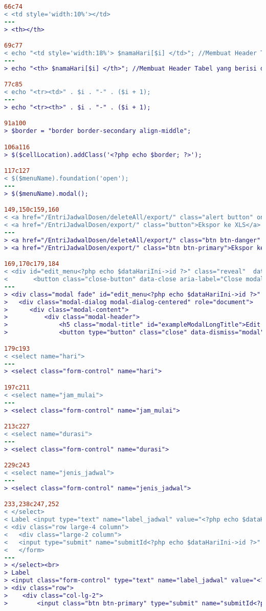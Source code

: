 \begin{lstlisting}[language=diff, caption=Kode untuk Halaman Entri Jadwal Dosen,  basicstyle=\ttfamily, frame=single,
columns=fullflexible, keepspaces=true, breaklines=true, label={lst:mainEntriJadwalDosen}]
66c74
< <td style='width:10%'></td>
---
> <th></th>

69c77
< echo "<td style='width:18%'> $namaHari[$i] </td>"; //Membuat Header Tabel yang berisi daftar hari
---
> echo "<th> $namaHari[$i] </th>"; //Membuat Header Tabel yang berisi daftar hari

77c85
< echo "<tr><td>" . $i . "-" . ($i + 1);
---
> echo "<tr><th>" . $i . "-" . ($i + 1);

91a100
> $border = "border border-secondary align-middle";

106a116
> $($cellLocation).addClass('<?php echo $border; ?>');

117c127
< $($menuName).foundation('open');
---
> $($menuName).modal();

149,150c159,160
< <a href="/EntriJadwalDosen/deleteAll/export/" class="alert button" onClick="return konfirmasi();">Delete All</a>
< <a href="/EntriJadwalDosen/export/" class="button">Ekspor ke XLS</a>
---
> <a href="/EntriJadwalDosen/deleteAll/export/" class="btn btn-danger" onClick="return konfirmasi();">Delete All</a>
> <a href="/EntriJadwalDosen/export/" class="btn btn-primary">Ekspor ke XLS</a>

169,170c179,184
< <div id="edit_menu<?php echo $dataHariIni->id ?>" class="reveal"  data-reveal >
< 		<button class="close-button" data-close aria-label="Close modal" type="button">
---
> <div class="modal fade" id="edit_menu<?php echo $dataHariIni->id ?>" tabindex="-1" role="dialog" aria-hidden="true">
> 	<div class="modal-dialog modal-dialog-centered" role="document">
> 	   <div class="modal-content">
> 	       <div class="modal-header">
> 	           <h5 class="modal-title" id="exampleModalLongTitle">Edit Jadwal #<?= $dataHariIni->id ?></h5>
> 	           <button type="button" class="close" data-dismiss="modal" aria-label="Close">

179c193
< <select name="hari"> 
---
> <select class="form-control" name="hari">

197c211
< <select name="jam_mulai"> 
---
> <select class="form-control" name="jam_mulai">

213c227
< <select name="durasi"> 
---
> <select class="form-control" name="durasi">

229c243
< <select name="jenis_jadwal"> 
---
> <select class="form-control" name="jenis_jadwal">

233,238c247,252
< </select>
< Label <input type="text" name="label_jadwal" value="<?php echo $dataHariIni->label; ?>"><br> 
< <div class="row large-4 column">
< 	<div class="large-2 column">
< 	<input type="submit" name="submitId<?php echo $dataHariIni->id ?>" class="button" value="Save  ">
< 	</form>
---
> </select><br>
> Label
> <input class="form-control" type="text" name="label_jadwal" value="<?php echo $dataHariIni->label; ?>"><br>
> <div class="row">
>    <div class="col-lg-2">
>        <input class="btn btn-primary" type="submit" name="submitId<?php echo $dataHariIni->id ?>" class="button" value="Save  ">


\end{lstlisting}
